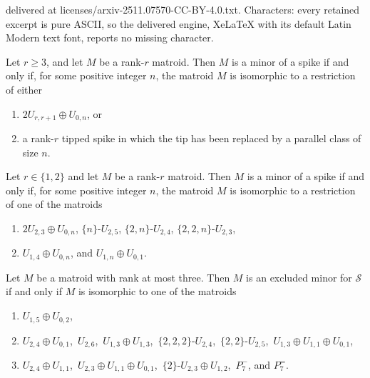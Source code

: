 \documentclass[10pt,a4paper]{amsart}
\newcommand{\cS}{\mathcal{S}}
\begin{document}
delivered at licenses/arxiv-2511.07570-CC-BY-4.0.txt. Characters: every retained excerpt is pure ASCII, so the delivered engine, XeLaTeX with its default Latin Modern text font, reports no missing character.
\begin{lemma}
\label{lemma: spike degeneracy}
Let $r\ge 3$, and let $M$ be a rank-$r$ matroid. Then $M$ is a minor of a spike if and only if, for some positive integer $n$, the matroid $M$ is isomorphic to a restriction of either
\begin{enumerate}[{\rm (i)}]
\item $2U_{r, r+1}\oplus U_{0, n}$, or

\item a rank-$r$ tipped spike in which the tip has been replaced by a parallel class of size $n$.
\end{enumerate}
\end{lemma}

\begin{lemma}
\label{lem:smaller_spike_minors}
Let $r\in \{1, 2\}$ and let $M$ be a rank-$r$ matroid. Then $M$ is a minor of a spike if and only if, for some positive integer $n$, the matroid $M$ is isomorphic to a restriction of one of the matroids
\begin{enumerate}[{\rm (i)}]
\item $2U_{2, 3}\oplus U_{0, n}$, $\{n\}$-$U_{2,5}$, $\{2, n\}$-$U_{2,4}$, $\{2, 2, n\}$-$U_{2,3}$,

\item $U_{1, 4}\oplus U_{0, n}$, and $U_{1, n}\oplus U_{0, 1}$.
\end{enumerate}
\end{lemma}

\begin{lemma}
\label{lemma: small spike-minors}
Let $M$ be a matroid with rank at most three. Then $M$ is an excluded minor for $\cS$ if and only if $M$ is isomorphic to one of the matroids
\begin{enumerate}[{\rm (i)}]
\item $U_{1, 5}\oplus U_{0, 2}$,

\item $U_{2, 4}\oplus U_{0, 1}$,\, $U_{2, 6}$,\, $U_{1, 3}\oplus U_{1, 3}$,\, $\{2, 2, 2\}$-$U_{2, 4}$,\, $\{2, 2\}$-$U_{2, 5}$,\, $U_{1, 3}\oplus U_{1, 1}\oplus U_{0, 1}$,

\item $U_{2, 4}\oplus U_{1, 1}$,\, $U_{2, 3}\oplus U_{1, 1}\oplus U_{0, 1}$,\, $\{2\}$-$U_{2, 3}\oplus U_{1, 2}$,\, $P_7^-$, and $P_7^=$.
\end{enumerate}
\end{lemma}
\end{document}
